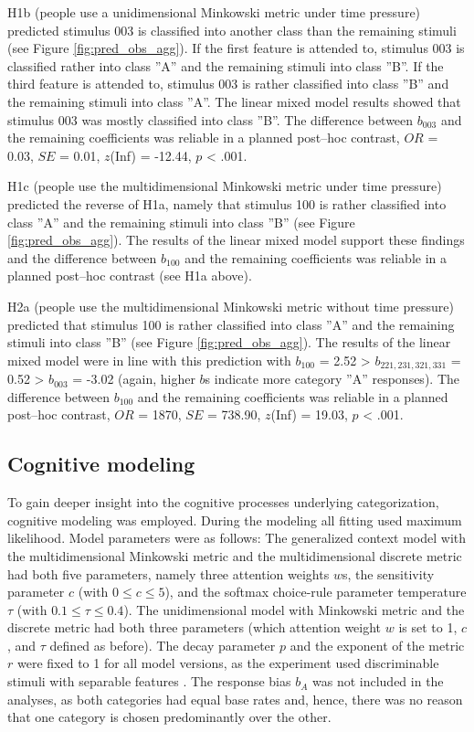 \documentclass[a4paper,man,natbib]{apa6}
\begin{document}
H1b (people use a unidimensional Minkowski metric under time pressure) predicted stimulus 003 is classified into another class than the remaining stimuli (see Figure \ref{fig:pred_obs_agg}). If the first feature is attended to, stimulus 003 is classified rather into class ''A'' and the remaining stimuli into class ''B''. If the third feature is attended to, stimulus 003 is rather classified into class ''B'' and the remaining stimuli into class ''A''. The linear mixed model results showed that stimulus 003 was mostly classified into class ''B''. The difference between $b_{003}$ and the remaining coefficients was reliable in a planned post--hoc contrast, $OR$ = 0.03, $SE$ = 0.01, $z$(Inf) = -12.44, $p$ < .001. 

H1c (people use the multidimensional Minkowski metric under time pressure) predicted the reverse of H1a, namely that stimulus 100 is rather classified into class ''A'' and the remaining stimuli into class ''B'' (see Figure \ref{fig:pred_obs_agg}). The results of the linear mixed model support these findings and the difference between $b_{100}$ and the remaining coefficients was reliable in a planned post--hoc contrast (see H1a above). 

H2a (people use the multidimensional Minkowski metric without time pressure) predicted that stimulus 100 is rather classified into class ''A'' and the remaining stimuli into class ''B'' (see Figure \ref{fig:pred_obs_agg}). The results of the linear mixed model were in line with this prediction with $b_{100}$ = 2.52 > $ b_{221,231,321,331}$ = 0.52 > $b_{003}$ = -3.02 (again, higher $b$s indicate more category ''A'' responses). The difference between $b_{100}$ and the remaining coefficients was reliable in a planned post--hoc contrast, $OR$ = 1870, $SE$ = 738.90, $z$(Inf) = 19.03, $p$ < .001. 

\subsection{Cognitive modeling}
To gain deeper insight into the cognitive processes underlying categorization, cognitive modeling was employed. During the modeling all fitting used maximum likelihood. Model parameters were as follows: The generalized context model with the multidimensional Minkowski metric and the multidimensional discrete metric had both five parameters, namely three attention weights $w$s, the sensitivity parameter $c$ (with $0 \leq c \leq 5$), and the softmax choice-rule parameter temperature $\tau$ (with $0.1 \leq \tau \leq 0.4$). The unidimensional model with Minkowski metric and the discrete metric had both three parameters (which attention weight $w$ is set to 1, $c$, and $\tau$ defined as before). The decay parameter $p$ and the exponent of the metric $r$ were fixed to 1 for all model versions, as the experiment used discriminable stimuli with separable features \citep{ennis1988confusable, nosofsky1985luce, shepard1964attention, garner1974processing}. The response bias $b_A$ was not included in the analyses, as both categories had equal base rates and, hence, there was no reason that one category is chosen predominantly over the other. 
\end{document}
